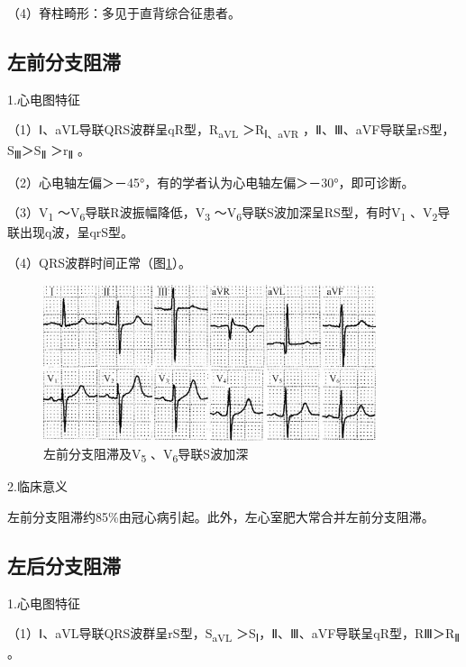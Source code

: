 （4）脊柱畸形：多见于直背综合征患者。

\protect\hypertarget{text00009.htmlux5cux23subid52}{}{}

\subsection{左前分支阻滞}

1.心电图特征

（1）Ⅰ、aVL导联QRS波群呈qR型，R\textsubscript{aVL}
＞R\textsubscript{Ⅰ、aVR} ，Ⅱ、Ⅲ、aVF导联呈rS型，S\textsubscript{Ⅲ}＞S\textsubscript{Ⅱ} ＞r\textsubscript{Ⅱ} 。

（2）心电轴左偏＞－45°，有的学者认为心电轴左偏＞－30°，即可诊断。

（3）V\textsubscript{1} ～V\textsubscript{6}导联R波振幅降低，V\textsubscript{3} ～V\textsubscript{6}导联S波加深呈RS型，有时V\textsubscript{1} 、V\textsubscript{2}导联出现q波，呈qrS型。

（4）QRS波群时间正常（图\ref{fig3-11}）。

\begin{figure}[!htbp]
 \centering
 \includegraphics[width=3.84375in,height=1.8125in]{./images/Image00061.jpg}
 \captionsetup{justification=centering}
 \caption{左前分支阻滞及V\textsubscript{5} 、V\textsubscript{6}导联S波加深}
 \label{fig3-11}
  \end{figure} 


2.临床意义

左前分支阻滞约85\%由冠心病引起。此外，左心室肥大常合并左前分支阻滞。

\protect\hypertarget{text00009.htmlux5cux23subid53}{}{}

\subsection{左后分支阻滞}

1.心电图特征

（1）Ⅰ、aVL导联QRS波群呈rS型，S\textsubscript{aVL} ＞S\textsubscript{Ⅰ}，Ⅱ、Ⅲ、aVF导联呈qR型，RⅢ＞R\textsubscript{Ⅱ} 。

